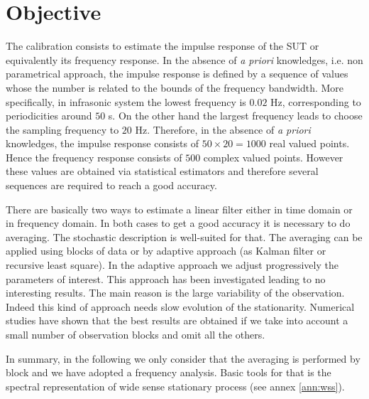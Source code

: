  \newpage\clearpage
\section{Objective}
The calibration consists to estimate the impulse response of the SUT or equivalently its frequency response. In the absence of {\it a priori} knowledges, i.e. non parametrical approach, the impulse response is defined by a sequence of values whose the number is related to the bounds of the frequency bandwidth. More specifically, in infrasonic system the lowest frequency is $0.02$ Hz, corresponding to periodicities around $50$ s. On the other hand the largest frequency leads to choose the sampling frequency to $20$ Hz. Therefore, in the absence of {\it a priori} knowledges, the impulse response consists of $50\times 20=1000$ real valued points. Hence the frequency response consists of $500$ complex valued points. However these values are obtained via statistical estimators and therefore several sequences  are required to reach a good accuracy.

There are basically two ways to estimate a linear filter either in time domain or in frequency domain. In both cases to get a good accuracy it is necessary to do averaging. The stochastic description is well-suited for that. The averaging can be applied using blocks of data or by adaptive approach (as Kalman filter or recursive least square). In the adaptive approach we adjust progressively the parameters of interest. This approach has been investigated leading to no interesting results. The main reason is the large variability of the observation. Indeed this kind of approach needs slow evolution of the stationarity. Numerical studies have shown that the best results are obtained if we take into account a small number of observation blocks and omit all the others.

In summary, in the following we only consider that the averaging is performed by block and we have adopted a frequency analysis. Basic tools for that is the spectral representation of wide sense stationary process (see annex \ref{ann:wss}).




